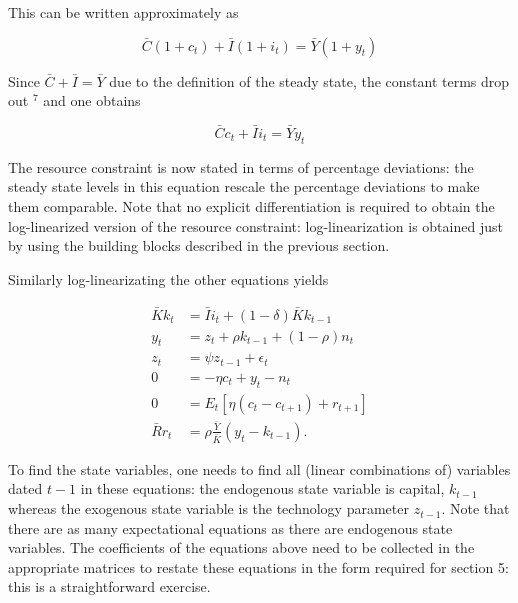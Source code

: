 \documentclass[10pt]{article}
\begin{document}
This can be written approximately as

\begin{equation*}
\bar{C}\left(1+c_{t}\right)+\bar{I}\left(1+i_{t}\right)=\bar{Y}\left(1+y_{t}\right)
\end{equation*}

Since $\bar{C}+\bar{I}=\bar{Y}$ due to the definition of the steady state, the constant terms drop out ${ }^{7}$ and one obtains

\begin{equation*}
\bar{C} c_{t}+\bar{I} i_{t}=\bar{Y} y_{t} \tag{4.4}
\end{equation*}

The resource constraint is now stated in terms of percentage deviations: the steady state levels in this equation rescale the percentage deviations to make them comparable. Note that no explicit differentiation is required to obtain the log-linearized version of the resource constraint: log-linearization is obtained just by using the building blocks described in the previous section.

Similarly log-linearizating the other equations yields

\begin{equation*}
\begin{aligned}
\bar{K} k_{t} & =\bar{I} i_{t}+(1-\delta) \bar{K} k_{t-1} \\
y_{t} & =z_{t}+\rho k_{t-1}+(1-\rho) n_{t} \\
z_{t} & =\psi z_{t-1}+\epsilon_{t} \\
0 & =-\eta c_{t}+y_{t}-n_{t} \\
0 & =E_{t}\left[\eta\left(c_{t}-c_{t+1}\right)+r_{t+1}\right] \\
\bar{R} r_{t} & =\rho \frac{\bar{Y}}{\bar{K}}\left(y_{t}-k_{t-1}\right) .
\end{aligned}
\end{equation*}

To find the state variables, one needs to find all (linear combinations of) variables dated $t-1$ in these equations: the endogenous state variable is capital, $k_{t-1}$ whereas the exogenous state variable is the technology parameter $z_{t-1}$. Note that there are as many expectational equations as there are endogenous state variables. The coefficients of the equations above need to be collected in the appropriate matrices to restate these equations in the form required for section 5: this is a straightforward exercise.
\end{document}
